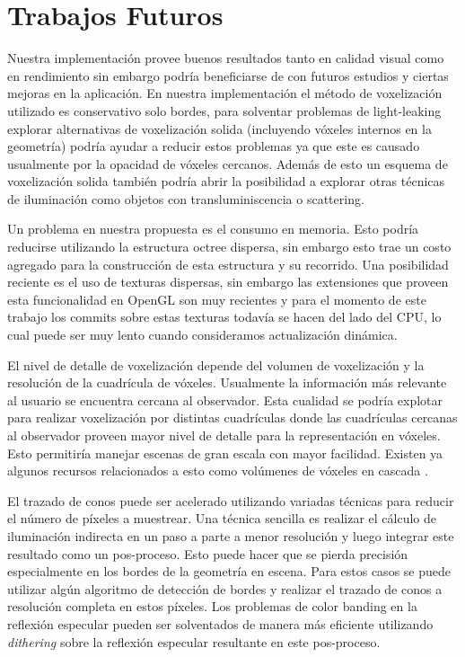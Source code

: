 \section{Trabajos Futuros} %
\label{sec:trabajos_futuros}
Nuestra implementación provee buenos resultados tanto en calidad visual como en rendimiento sin embargo podría beneficiarse de con futuros estudios y ciertas mejoras en la aplicación. En nuestra implementación el método de voxelización utilizado es conservativo solo bordes, para solventar problemas de light-leaking explorar alternativas de voxelización solida (incluyendo vóxeles internos en la geometría) podría ayudar a reducir estos problemas ya que este es causado usualmente por la opacidad de vóxeles cercanos. Además de esto un esquema de voxelización solida también podría abrir la posibilidad a explorar otras técnicas de iluminación como objetos con transluminiscencia o scattering.

Un problema en nuestra propuesta es el consumo en memoria. Esto podría reducirse utilizando la estructura octree dispersa, sin embargo esto trae un costo agregado para la construcción de esta estructura y su recorrido. Una posibilidad reciente es el uso de texturas dispersas, sin embargo las extensiones que proveen esta funcionalidad en OpenGL son muy recientes y para el momento de este trabajo los commits sobre estas texturas todavía se hacen del lado del CPU, lo cual puede ser muy lento cuando consideramos actualización dinámica.

El nivel de detalle de voxelización depende del volumen de voxelización y la resolución de la cuadrícula de vóxeles. Usualmente la información más relevante al usuario se encuentra cercana al observador. Esta cualidad se podría explotar para realizar voxelización por distintas cuadrículas donde las cuadrículas cercanas al observador proveen mayor nivel de detalle para la representación en vóxeles. Esto permitiría manejar escenas de gran escala con mayor facilidad. Existen ya algunos recursos relacionados a esto como volúmenes de vóxeles en cascada \cite{McLaren:2015:TCL:2775280.2792546}.

El trazado de conos puede ser acelerado utilizando variadas técnicas para reducir el número de píxeles a muestrear. Una técnica sencilla es realizar el cálculo de iluminación indirecta en un paso a parte a menor resolución y luego integrar este resultado como un pos-proceso. Esto puede hacer que se pierda precisión especialmente en los bordes de la geometría en escena. Para estos casos se puede utilizar algún algoritmo de detección de bordes y realizar el trazado de conos a resolución completa en estos píxeles. Los problemas de color banding en la reflexión especular pueden ser solventados de manera más eficiente utilizando \emph{dithering} sobre la reflexión especular resultante en este pos-proceso.
